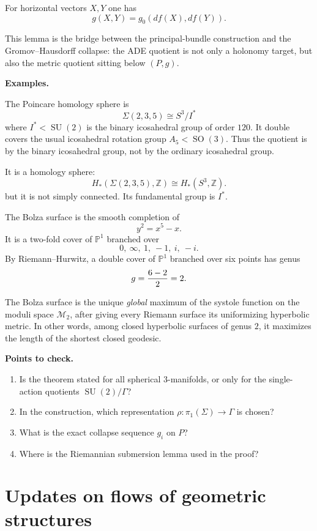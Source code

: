 For horizontal vectors $X,Y$ one has
$$
        g(X,Y)=g_0(df(X),df(Y)).
$$

This lemma is the bridge between the
principal-bundle construction and the
Gromov--Hausdorff collapse:
the ADE quotient is not only a
holonomy target, but also the metric
quotient sitting below $(P,g)$.

\medskip\noindent
{\bf Examples.}

The Poincare homology sphere is
$$
        \Sigma(2,3,5)\cong S^3/I^*
$$
where
$I^*<\operatorname{SU}(2)$ is the
binary icosahedral group of order
$120$.
It double covers the usual icosahedral
rotation group
$A_5<\operatorname{SO}(3)$.
Thus the quotient is by the binary
icosahedral group, not by the ordinary
icosahedral group.

It is a homology sphere:
$$
        H_*(\Sigma(2,3,5),\mathbb{Z})
        \cong H_*(S^3,\mathbb{Z}).
$$
but it is not simply connected.
Its fundamental group is $I^*$.

The Bolza surface is the smooth
completion of
$$
        y^2=x^5-x.
$$
It is a two-fold cover of
$\mathbb{P}^1$ branched over
$$
        0,\ \infty,\ 1,\ -1,\ i,\ -i.
$$
By Riemann--Hurwitz, a double cover of
$\mathbb{P}^1$ branched over six points has
genus
$$
        g={6-2\over 2}=2.
$$

The Bolza surface is the unique
{\it global} maximum of the systole
function on the moduli space
${\mathcal M}_2$, after giving every
Riemann surface its uniformizing
hyperbolic metric.
In other words, among closed
hyperbolic surfaces of genus $2$,
it maximizes the length of the
shortest closed geodesic.

\medskip\noindent
{\bf Points to check.}

\begin{enumerate}
\item Is the theorem stated for all
spherical 3-manifolds, or only for the
single-action quotients
$\operatorname{SU}(2)/\Gamma$?
\item In the construction, which
representation
$\rho:\pi_1(\Sigma)\to\Gamma$ is chosen?
\item What is the exact collapse
sequence $g_i$ on $P$?
\item Where is the Riemannian submersion
lemma used in the proof?
\end{enumerate}

\section{Updates on flows of
geometric structures}
\label{section-updates-on-flows-of-
geometric-structures}


